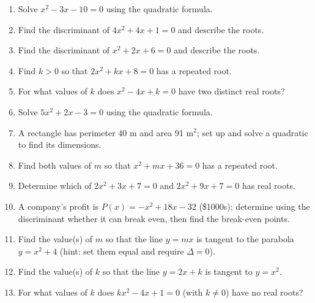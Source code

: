\documentclass[11pt]{article}
\begin{document}
\clearpage
{}

\begin{recapbox}
\begin{multicols}{2}
\small
\begin{enumerate}[leftmargin=*,itemsep=3pt]
  \item Solve $x^2-3x-10=0$ using the quadratic formula.
  \item Find the discriminant of $4x^2+4x+1=0$ and describe the roots.
  \item Find the discriminant of $x^2+2x+6=0$ and describe the roots.
  \item Find $k>0$ so that $2x^2+kx+8=0$ has a repeated root.
  \item For what values of $k$ does $x^2-4x+k=0$ have two distinct real roots?
  \item Solve $5x^2+2x-3=0$ using the quadratic formula.
  \item A rectangle has perimeter 40 m and area 91 m$^2$; set up and solve a quadratic to find its dimensions.
  \item Find both values of $m$ so that $x^2+mx+36=0$ has a repeated root.
  \item Determine which of $2x^2+3x+7=0$ and $2x^2+9x+7=0$ has real roots.
  \item A company's profit is $P(x)=-x^2+18x-32$ (\$1000s); determine using the discriminant whether it can break even, then find the break-even points.
  \item Find the value(s) of $m$ so that the line $y=mx$ is tangent to the parabola $y=x^2+4$ (hint: set them equal and require $\Delta=0$).
  \item Find the value(s) of $k$ so that the line $y=2x+k$ is tangent to $y=x^2$.
  \item For what values of $k$ does $kx^2-4x+1=0$ (with $k\neq0$) have no real roots?
\end{enumerate}
\end{multicols}
\end{recapbox}
\end{document}
